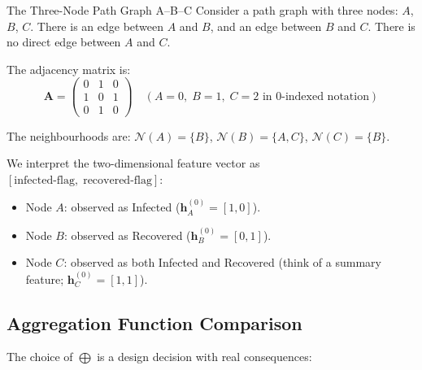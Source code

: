\begin{examplebox}{The Three-Node Path Graph A--B--C}
Consider a path graph with three nodes: $A$, $B$, $C$. There is an edge between $A$ and $B$, and an edge between $B$ and $C$. There is no direct edge between $A$ and $C$.

\begin{center}
\end{center}

The adjacency matrix is:
\[
\mathbf{A} = \begin{pmatrix} 0 & 1 & 0 \\ 1 & 0 & 1 \\ 0 & 1 & 0 \end{pmatrix}
\quad
(A=0,\; B=1,\; C=2 \text{ in 0-indexed notation})
\]

The neighbourhoods are: $\mathcal{N}(A) = \{B\}$, $\mathcal{N}(B) = \{A, C\}$, $\mathcal{N}(C) = \{B\}$.

We interpret the two-dimensional feature vector as $[\text{infected-flag},\; \text{recovered-flag}]$:
\begin{itemize}[noitemsep]
    \item Node $A$: observed as Infected ($\mathbf{h}_A^{(0)} = [1,0]$).
    \item Node $B$: observed as Recovered ($\mathbf{h}_B^{(0)} = [0,1]$).
    \item Node $C$: observed as both Infected and Recovered (think of a summary feature; $\mathbf{h}_C^{(0)} = [1,1]$).
\end{itemize}
\end{examplebox}

\subsection{Aggregation Function Comparison}

The choice of $\bigoplus$ is a design decision with real consequences:

